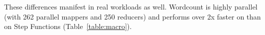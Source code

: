 These differences manifest in real workloads as well. Wordcount is highly
parallel (with 262 parallel mappers and 250 reducers) and performs over 2x
faster on \name{} than on Step Functions (Table~\ref{table:macro}).









